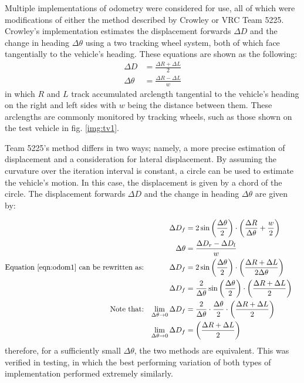 \documentclass[mla8alt]{mla}
\begin{document}
\begin{paper}
Multiple implementations of odometry were considered for use, all of which were modifications of either the method described by Crowley or VRC Team 5225. Crowley's implementation estimates the displacement forwards $\Delta D$ and the change in heading $\Delta \theta$ using a two tracking wheel system, both of which face tangentially to the vehicle's heading. These equations are shown as the following:
\begin{subequations}
\begin{align}
\Delta D &= \frac{\Delta R+\Delta L}{2} \\
\Delta \theta &= \frac{\Delta R- \Delta L}{w}
\end{align}
\end{subequations}
in which $R$ and $L$ track accumulated arclength tangential to the vehicle's heading on the right and left sides with $w$ being the distance between them. These arclengths are commonly monitored by tracking wheels, such as those shown on the test vehicle in fig. \ref{img:tv1}.

Team 5225's method differs in two ways; namely, a more precise estimation of displacement and a consideration for lateral displacement. By assuming the curvature over the iteration interval is constant, a circle can be used to estimate the vehicle's motion. In this case, the displacement is given by a chord of the circle. The displacement forwards $\Delta D$ and the change in heading $\Delta \theta$ are given by:

\begin{subequations}
\begin{flalign}
&&\Delta D_f &= 2\sin{\left(\frac{\Delta\theta}{2}\right)} \cdot \left(\frac{\Delta R}{\Delta \theta}+\frac{w}{2}\right) \label{eqn:odom1} &&\\
&&\Delta \theta &= \frac{\Delta D_r- \Delta D_l}{w} &&\\
\text{Equation \ref{eqn:odom1} can be rewritten as:} 
&&\Delta D_f &= 2\sin{\left(\frac{\Delta\theta}{2}\right)} \cdot \left(\frac{\Delta R + \Delta L}{2\Delta \theta}\right) &&\\
&&\Delta D_f &= \frac{2}{\Delta \theta}\sin{\left(\frac{\Delta\theta}{2}\right)} \cdot \left(\frac{\Delta R + \Delta L}{2}\right) &&\\
\text{Note that:} 
&&\lim_{\Delta\theta\to 0} \Delta D_f &= \frac{2}{\Delta \theta} \cdot \frac{\Delta\theta}{2} \cdot \left(\frac{\Delta R + \Delta L}{2}\right) &&\\ 
&&\lim_{\Delta\theta\to 0} \Delta D_f &= \left(\frac{\Delta R + \Delta L}{2}\right) &&
\end{flalign}
\end{subequations}
therefore, for a sufficiently small $\Delta \theta$, the two methods are equivalent. This was verified in testing, in which the best performing variation of both types of implementation performed extremely similarly.


\end{paper}
\end{document}
